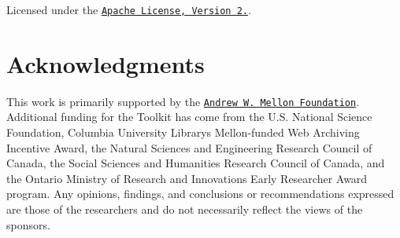 Licensed under the \href{http://www.apache.org/licenses/LICENSE-2.0}{\tt Apache License, Version 2.}.

\section*{Acknowledgments}

This work is primarily supported by the \href{https://uwaterloo.ca/arts/news/multidisciplinary-project-will-help-historians-unlock}{\tt Andrew W. Mellon Foundation}. Additional funding for the Toolkit has come from the U.\+S. National Science Foundation, Columbia University Library\textquotesingle{}s Mellon-\/funded Web Archiving Incentive Award, the Natural Sciences and Engineering Research Council of Canada, the Social Sciences and Humanities Research Council of Canada, and the Ontario Ministry of Research and Innovation\textquotesingle{}s Early Researcher Award program. Any opinions, findings, and conclusions or recommendations expressed are those of the researchers and do not necessarily reflect the views of the sponsors. 